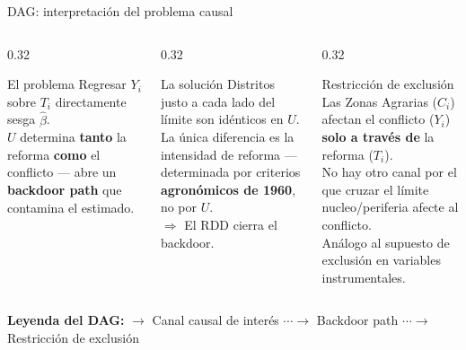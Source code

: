 \documentclass[aspectratio=169,t]{beamer}
\begin{document}
\begin{frame}{DAG: interpretaci\'on del problema causal}
\vspace{0.1cm}
\begin{columns}[T]
  \begin{column}{0.32\textwidth}
    \begin{alertblock}{El problema}
    \small
    Regresar $Y_i$ sobre $T_i$ directamente
    sesga $\hat{\beta}$.\\[0.2cm]
    $U$ determina \textbf{tanto} la reforma
    \textbf{como} el conflicto --- abre un
    \textbf{backdoor path} que contamina
    el estimado.
    \end{alertblock}
  \end{column}
  \begin{column}{0.32\textwidth}
    \begin{block}{La soluci\'on}
    \small
    Distritos justo a cada lado del l\'imite
    son id\'enticos en $U$.\\[0.2cm]
    La \'unica diferencia es la intensidad
    de reforma --- determinada por criterios
    \textbf{agron\'omicos de 1960},
    no por $U$.\\[0.2cm]
    $\Rightarrow$ El RDD cierra el backdoor.
    \end{block}
  \end{column}
  \begin{column}{0.32\textwidth}
    \begin{block}{Restricci\'on de exclusi\'on}
    \small
    Las Zonas Agrarias ($C_i$) afectan el
    conflicto ($Y_i$)
    \textbf{solo a trav\'es de} la reforma
    ($T_i$).\\[0.2cm]
    No hay otro canal por el que cruzar
    el l\'imite nucleo/periferia afecte
    al conflicto.\\[0.2cm]
    An\'alogo al supuesto de exclusi\'on
    en variables instrumentales.
    \end{block}
  \end{column}
\end{columns}
\vspace{0.2cm}
\begin{alertblock}{}
\centering\small
\textbf{Leyenda del DAG:}\quad
{\color{azulmedio}$\longrightarrow$} Canal causal de inter\'es\quad
{\color{azuloscuro}$\cdots\!\to$} Backdoor path\quad
{\color{azulmedio!60}$\cdots\!\to$} Restricci\'on de exclusi\'on
\end{alertblock}
\end{frame}
\end{document}

